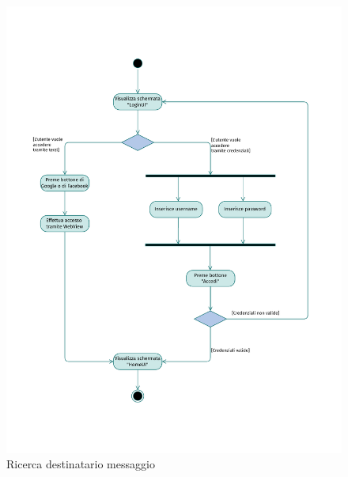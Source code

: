 \documentclass{natourDoc}
\begin{document}
\begin{figure}[!htbp]
	\centering
	\includegraphics[width=\textwidth, page=17]{./diagrams/activity.pdf}
	\caption{Ricerca destinatario messaggio}
\end{figure}
\FloatBarrier
\end{document}
